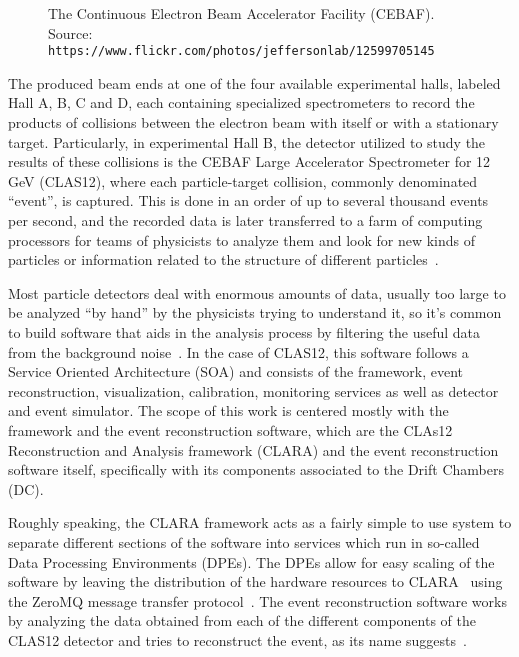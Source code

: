     \begin{figure}[ht]
        \centering
        \caption{\label{fig:cebaf} The Continuous Electron Beam Accelerator Facility (CEBAF). Source: \texttt{https://www.flickr.com/photos/jeffersonlab/12599705145}}
    \end{figure}

The produced beam ends at one of the four available experimental halls, labeled Hall A, B, C and D, each containing specialized spectrometers to record the products of collisions between the electron beam with itself or with a stationary target.
Particularly, in experimental Hall B, the detector utilized to study the results of these collisions is the CEBAF Large Accelerator Spectrometer for 12 GeV (CLAS12), where each particle-target collision, commonly denominated ``event'', is captured.
This is done in an order of up to several thousand events per second, and the recorded data is later transferred to a farm of computing processors for teams of physicists to analyze them and look for new kinds of particles or information related to the structure of different particles~\cite{mecking2003cebaf}.

Most particle detectors deal with enormous amounts of data, usually too large to be analyzed ``by hand'' by the physicists trying to understand it, so it's common to build software that aids in the analysis process by filtering the useful data from the background noise~\cite{demchenko2013addressing}.
In the case of CLAS12, this software follows a Service Oriented Architecture (SOA) and consists of the framework, event reconstruction, visualization, calibration, monitoring services as well as detector and event simulator.
The scope of this work is centered mostly with the framework and the event reconstruction software, which are the CLAs12 Reconstruction and Analysis framework (CLARA) and the event reconstruction software itself, specifically with its components associated to the Drift Chambers (DC).

Roughly speaking, the CLARA framework acts as a fairly simple to use system to separate different sections of the software into services which run in so-called Data Processing Environments (DPEs).
The DPEs allow for easy scaling of the software by leaving the distribution of the hardware resources to CLARA~\cite{gyurjyan2013clara,gyurjyan2015component} using the ZeroMQ message transfer protocol~\cite{hintjens2013zeromq}.
The event reconstruction software works by analyzing the data obtained from each of the different components of the CLAS12 detector and tries to reconstruct the event, as its name suggests~\cite{ziegler2013clas12}.

